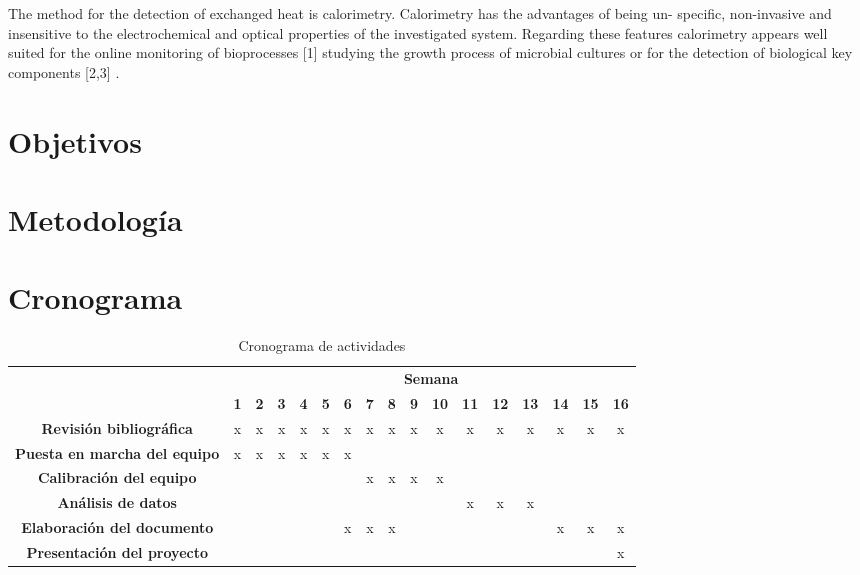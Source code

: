 	The method for the detection of exchanged heat is
	calorimetry. Calorimetry has the advantages of being un-
	specific, non-invasive and insensitive to the electrochemical	and optical properties of the investigated system. Regarding these features calorimetry appears well suited for the online
	monitoring of bioprocesses [1] studying the growth process	of microbial cultures or for the detection of biological key components [2,3] \cite{winkelmann2004application}.
\section{Objetivos}

\section{Metodología}

\section{Cronograma}
\begin{table}[h]
	\centering
	\caption{Cronograma de actividades}
	\label{tb: cronograma}
	\begin{tabular}{|c|c|c|c|c|c|c|c|c|c|c|c|c|c|c|c|c|}
		\hline
		\rowcolor[HTML]{C0C0C0} 
		\cellcolor[HTML]{C0C0C0}                                       & \multicolumn{16}{c|}{\cellcolor[HTML]{C0C0C0}\textbf{Semana}} \\ \cline{2-17} 
		\rowcolor[HTML]{EFEFEF} 
		\multirow{-2}{*}{\cellcolor[HTML]{C0C0C0}\textbf{Actividades}} & \textbf{1} & \textbf{2} & \textbf{3} & \textbf{4} & \textbf{5} & \textbf{6} & \textbf{7} & \textbf{8} & \textbf{9} & \textbf{10} & \textbf{11} & \textbf{12} & \textbf{13} & \textbf{14} & \textbf{15} & \textbf{16} \\ \hline
		\cellcolor[HTML]{EFEFEF}
		\textbf{Revisión bibliográfica} & x & x & x & x & x & x & x & x & x & x & x & x & x & x & x & x \\ \hline
		\cellcolor[HTML]{EFEFEF}\textbf{Puesta en marcha del equipo} & x & x & x & x & x & x & & & & & & & & & & \\ \hline
		\cellcolor[HTML]{EFEFEF}\textbf{Calibración del equipo} & & & & & & & x & x & x & x & & & & & & \\ \hline
		\cellcolor[HTML]{EFEFEF}\textbf{Análisis de datos} & & & & & & & & & & & x & x & x & & & \\ \hline
		\cellcolor[HTML]{EFEFEF}\textbf{Elaboración del documento} & & & & & & x & x & x & & & & & & x & x & x \\ \hline
		\cellcolor[HTML]{EFEFEF}\textbf{Presentación del proyecto} & & & & & & & & & & & & & & & & x \\ \hline
	\end{tabular}
\end{table}
